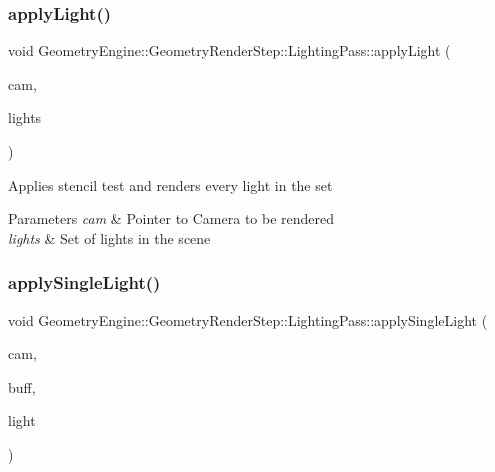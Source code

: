 \subsubsection{\texorpdfstring{applyLight()}{applyLight()}}
{\footnotesize\ttfamily void Geometry\+Engine\+::\+Geometry\+Render\+Step\+::\+Lighting\+Pass\+::apply\+Light (\begin{DoxyParamCaption}\item[{\mbox{\hyperlink{class_geometry_engine_1_1_geometry_world_item_1_1_geometry_camera_1_1_camera}{Geometry\+World\+Item\+::\+Geometry\+Camera\+::\+Camera}} $\ast$}]{cam,  }\item[{std\+::unordered\+\_\+set$<$ \mbox{\hyperlink{class_geometry_engine_1_1_geometry_world_item_1_1_geometry_light_1_1_light}{Geometry\+World\+Item\+::\+Geometry\+Light\+::\+Light}} $\ast$ $>$ $\ast$}]{lights }\end{DoxyParamCaption})\hspace{0.3cm}{\ttfamily [protected]}}

Applies stencil test and renders every light in the set 
\begin{DoxyParams}{Parameters}
{\em cam} & Pointer to Camera to be rendered \\
\hline
{\em lights} & Set of lights in the scene \\
\hline
\end{DoxyParams}
\mbox{\label{class_geometry_engine_1_1_geometry_render_step_1_1_lighting_pass_a958341b3bf1f95dfb56bc5b2833813b0}} 
\subsubsection{\texorpdfstring{applySingleLight()}{applySingleLight()}}
{\footnotesize\ttfamily void Geometry\+Engine\+::\+Geometry\+Render\+Step\+::\+Lighting\+Pass\+::apply\+Single\+Light (\begin{DoxyParamCaption}\item[{\mbox{\hyperlink{class_geometry_engine_1_1_geometry_world_item_1_1_geometry_camera_1_1_camera}{Geometry\+World\+Item\+::\+Geometry\+Camera\+::\+Camera}} $\ast$}]{cam,  }\item[{const \mbox{\hyperlink{class_geometry_engine_1_1_buffers_info}{Buffers\+Info}} \&}]{buff,  }\item[{\mbox{\hyperlink{class_geometry_engine_1_1_geometry_world_item_1_1_geometry_light_1_1_light}{Geometry\+World\+Item\+::\+Geometry\+Light\+::\+Light}} $\ast$}]{light }\end{DoxyParamCaption})\hspace{0.3cm}{\ttfamily [protected]}}


